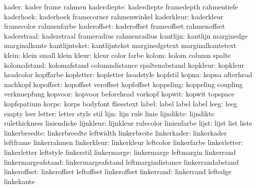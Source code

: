                kader:  kader                frame                rahmen
         kaderdiepte:  kaderdiepte          framedepth           rahmentiefe
           kaderhoek:  kaderhoek            framecorner          rahmenwinkel
          kaderkleur:  kaderkleur           framecolor           rahmenfarbe
         kaderoffset:  kaderoffset          frameoffset          rahmenoffset
         kaderstraal:  kaderstraal          frameradius          rahmenradius
            kantlijn:  kantlijn             marginedge           marginalkante
       kantlijntekst:  kantlijntekst        marginedgetext       marginalkantetext
               klein:  klein                small                klein
               kleur:  kleur                color                farbe
               kolom:  kolom                column               spalte
        kolomafstand:  kolomafstand         columndistance       spaltenabstand
            kopkleur:  kopkleur             headcolor            kopffarbe
           kopletter:  kopletter            headstyle            kopfstil
               kopna:  kopna                afterhead            nachkopf
           kopoffset:  kopoffset            veroffset            kopfoffset
           koppeling:  koppeling            coupling             verknuepfung
             kopvoor:  kopvoor              beforehead           vorkopf
              kopwit:  kopwit               topspace             kopfspatium
               korps:  korps                bodyfont             fliesstext
               label:  label                label                label
                leeg:  leeg                 empty                leer
              letter:  letter               style                stil
                lijn:  lijn                 rule                 linie
           lijndikte:  lijndikte            rulethickness        liniendicke
           lijnkleur:  lijnkleur            rulecolor            linienfarbe
               lijst:  lijst                list                 liste
       linkerbreedte:  linkerbreedte        leftwidth            linkerbreite
         linkerkader:  linkerkader          leftframe            linkerrahmen
         linkerkleur:  linkerkleur          leftcolor            linkerfarbe
        linkerletter:  linkerletter         leftstyle            linkerstil
         linkermarge:  linkermarge          leftmargin           linkerrand
  linkermargeafstand:  linkermargeafstand   leftmargindistance   linkerrandabstand
        linkeroffset:  linkeroffset         leftoffset           linkeroffset
          linkerrand:  linkerrand           leftedge             linkekante
